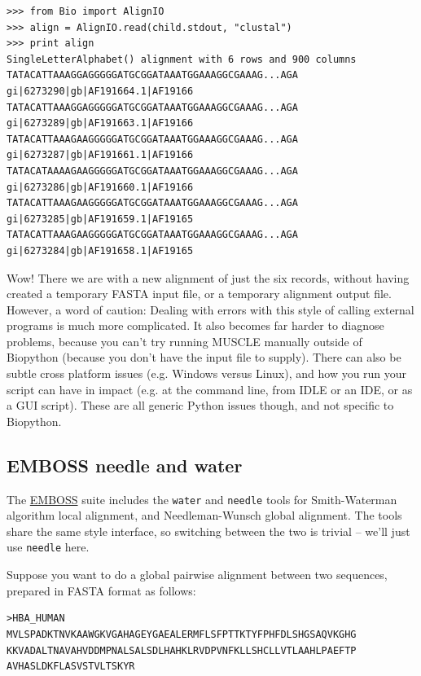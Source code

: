 \documentclass{report}
\begin{document}
\begin{verbatim}
>>> from Bio import AlignIO
>>> align = AlignIO.read(child.stdout, "clustal")
>>> print align
SingleLetterAlphabet() alignment with 6 rows and 900 columns
TATACATTAAAGGAGGGGGATGCGGATAAATGGAAAGGCGAAAG...AGA gi|6273290|gb|AF191664.1|AF19166
TATACATTAAAGGAGGGGGATGCGGATAAATGGAAAGGCGAAAG...AGA gi|6273289|gb|AF191663.1|AF19166
TATACATTAAAGAAGGGGGATGCGGATAAATGGAAAGGCGAAAG...AGA gi|6273287|gb|AF191661.1|AF19166
TATACATAAAAGAAGGGGGATGCGGATAAATGGAAAGGCGAAAG...AGA gi|6273286|gb|AF191660.1|AF19166
TATACATTAAAGAAGGGGGATGCGGATAAATGGAAAGGCGAAAG...AGA gi|6273285|gb|AF191659.1|AF19165
TATACATTAAAGAAGGGGGATGCGGATAAATGGAAAGGCGAAAG...AGA gi|6273284|gb|AF191658.1|AF19165
\end{verbatim}

Wow! There we are with a new alignment of just the six records, without having created
a temporary FASTA input file, or a temporary alignment output file. However, a word of
caution: Dealing with errors with this style of calling external programs is much more
complicated.
It also becomes far harder to diagnose problems, because you can't try running MUSCLE
manually outside of Biopython (because you don't have the input file to supply).
There can also be subtle cross platform issues (e.g. Windows versus Linux), and how
you run your script can have in impact (e.g. at the command line, from IDLE or an
IDE, or as a GUI script). These are all generic Python issues though, and not
specific to Biopython.

\subsection{EMBOSS needle and water}
\label{seq:emboss-needle-water}
The \href{http://emboss.sourceforge.net/}{EMBOSS} suite includes the \texttt{water} and
\texttt{needle} tools for Smith-Waterman algorithm local alignment, and Needleman-Wunsch
global alignment. The tools share the same style interface, so switching between the two
is trivial -- we'll just use \texttt{needle} here.

Suppose you want to do a global pairwise alignment between two sequences, prepared in
FASTA format as follows:

\begin{verbatim}
>HBA_HUMAN
MVLSPADKTNVKAAWGKVGAHAGEYGAEALERMFLSFPTTKTYFPHFDLSHGSAQVKGHG
KKVADALTNAVAHVDDMPNALSALSDLHAHKLRVDPVNFKLLSHCLLVTLAAHLPAEFTP
AVHASLDKFLASVSTVLTSKYR
\end{verbatim}
\end{document}
